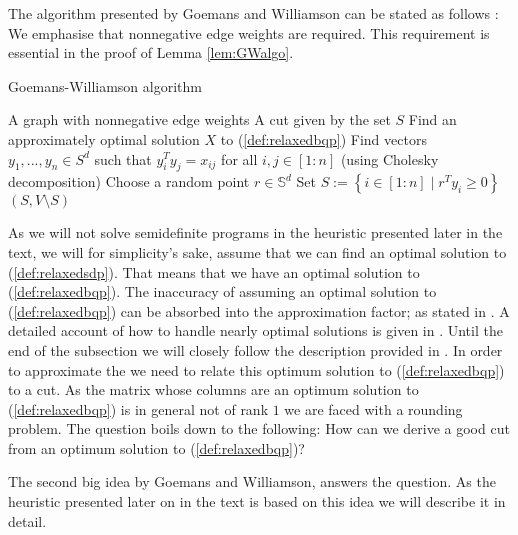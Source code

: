 \documentclass[12pt,a4paper]{article}
\theoremstyle{mythm}
\begin{document}
The algorithm presented by Goemans and Williamson can be stated as follows \cite[p.424]{Korte2018}:
We emphasise that nonnegative edge weights are required.
This requirement is essential in the proof of Lemma \ref{lem:GWalgo}.
\begin{algorithm}
\caption{Goemans-Williamson algorithm}
\label{alg:GWalgo} 
\begin{algorithmic}[1]
\Require A graph with nonnegative edge weights
\Ensure A cut given by the set $ S $
\State Find an approximately optimal solution $ X $ to (\ref{def:relaxedbqp}) 
\State Find vectors $ y_1, ..., y_n \in S^d $ such that  $ y_i^Ty_j= x _{ ij }  $ for all $ i,j \in \left[ 1:n \right]  $ (using Cholesky decomposition)
\State Choose a random point $ r \in \mathbb{S} ^{ d } $
\State Set $ S := \left\{ i \in \left[ 1:n \right]  \mid r ^T y_i \geq 0  \right\}  $
\State \Return $ ( S , V \setminus S) $
\end{algorithmic}
\end{algorithm}

As we will not solve semidefinite programs in the heuristic presented later in the text, we will for simplicity's sake, assume that we can find an optimal solution to
(\ref{def:relaxedsdp}).
That means that we have an optimal solution to (\ref{def:relaxedbqp}). 
The inaccuracy of assuming an optimal solution to (\ref{def:relaxedbqp}) can be absorbed into the approximation factor; as stated in \cite[p. 260]{Vazirani2003}. 
A detailed account of how to handle nearly optimal solutions is given in \cite{Korte2018}.
Until the end of the subsection we will closely follow the description provided in \cite[p. 260 ff]{Vazirani2003}.
In order to approximate the \MCP we need to relate this optimum solution to (\ref{def:relaxedbqp}) to a cut. 
As the matrix whose columns are an optimum solution to
(\ref{def:relaxedbqp}) is in general not of rank $ 1 $ we are faced with a rounding problem. 
The question boils down to the following: 
How can we derive a good cut from an optimum solution to (\ref{def:relaxedbqp})?

The second big idea by Goemans and Williamson, answers the question.
As the heuristic presented later on in the text is based on this idea we will describe it in detail.
\end{document}
